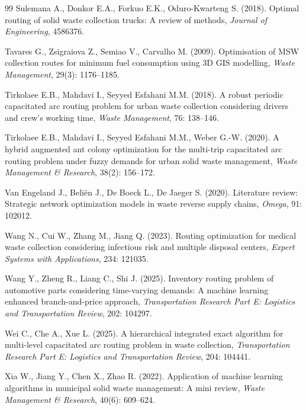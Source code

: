 \documentclass[preprint,11pt,authoryear]{elsarticle}
\begin{document}
\begin{thebibliography}{99}
Sulemana A., Donkor E.A., Forkuo E.K., Oduro-Kwarteng S. (2018). Optimal routing of solid waste collection trucks: A review of methods, \textit{Journal of Engineering}, 4586376.

Tavares G., Zsigraiova Z., Semiao V., Carvalho M. (2009). Optimisation of MSW collection routes for minimum fuel consumption using 3D GIS modelling, \textit{Waste Management}, 29(3): 1176--1185.

Tirkolaee E.B., Mahdavi I., Seyyed Esfahani M.M. (2018). A robust periodic capacitated arc routing problem for urban waste collection considering drivers and crew’s working time, \textit{Waste Management}, 76: 138--146.

Tirkolaee E.B., Mahdavi I., Seyyed Esfahani M.M., Weber G.-W. (2020). A hybrid augmented ant colony optimization for the multi-trip capacitated arc routing problem under fuzzy demands for urban solid waste management, \textit{Waste Management \& Research}, 38(2): 156--172.

Van Engeland J., Beliën J., De Boeck L., De Jaeger S. (2020). Literature review: Strategic network optimization models in waste reverse supply chains, \textit{Omega}, 91: 102012.  

Wang N., Cui W., Zhang M., Jiang Q. (2023). Routing optimization for medical waste collection considering infectious risk and multiple disposal centers, \textit{Expert Systems with Applications}, 234: 121035.

Wang Y., Zheng R., Liang C., Shi J. (2025). Inventory routing problem of automotive parts considering time-varying demands: A machine learning enhanced branch-and-price approach, \textit{Transportation Research Part E: Logistics and Transportation Review}, 202: 104297.

Wei C., Che A., Xue L. (2025). A hierarchical integrated exact algorithm for multi-level capacitated arc routing problem in waste collection, \textit{Transportation Research Part E: Logistics and Transportation Review}, 204: 104441.

Xia W., Jiang Y., Chen X., Zhao R. (2022). Application of machine learning algorithms in municipal solid waste management: A mini review, 
\textit{Waste Management \& Research}, 40(6): 609--624.


\end{thebibliography}
\end{document}
